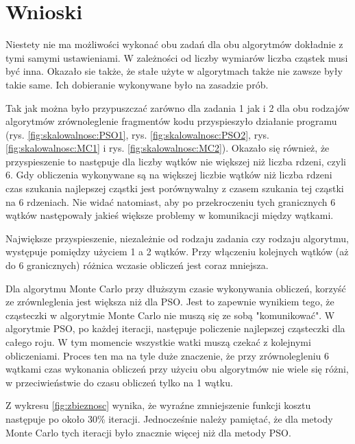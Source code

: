 \documentclass[11pt, a4paper, oneside]{article}
\begin{document}
\section{Wnioski} 

Niestety nie ma możliwości wykonać obu zadań dla obu algorytmów dokładnie z tymi samymi ustawieniami. W zależności od liczby wymiarów liczba cząstek musi być inna. Okazało sie także, że stałe użyte w algorytmach także nie zawsze były takie same. Ich dobieranie wykonywane było na zasadzie prób.

Tak jak można było przypuszczać zarówno dla zadania 1 jak i 2 dla obu rodzajów algorytmów zrównoleglenie fragmentów kodu przyspieszyło działanie programu (rys. \ref{fig:skalowalnosc:PSO1}, rys. \ref{fig:skalowalnosc:PSO2}, rys. \ref{fig:skalowalnosc:MC1} i rys. \ref{fig:skalowalnosc:MC2}). Okazało się również, że przyspieszenie to następuje dla liczby wątków nie większej niż liczba rdzeni, czyli 6. Gdy obliczenia wykonywane są na większej liczbie wątków niż liczba rdzeni czas szukania najlepszej cząstki jest porównywalny z czasem szukania tej cząstki na 6 rdzeniach. Nie widać natomiast, aby po przekroczeniu tych granicznych 6 wątków następowały jakieś większe problemy w komunikacji między wątkami.

Największe przyspieszenie, niezależnie od rodzaju zadania czy rodzaju algorytmu, występuje pomiędzy użyciem 1 a 2 wątków. Przy włączeniu kolejnych wątków (aż do 6 granicznych) różnica wczasie obliczeń jest coraz mniejsza.

Dla algorytmu Monte Carlo przy dłuższym czasie wykonywania obliczeń, korzyść ze zrównleglenia jest większa niż dla PSO. Jest to zapewnie wynikiem tego, że cząsteczki w algorytmie Monte Carlo nie muszą się ze sobą "komunikować". W algorytmie PSO, po każdej iteracji, następuje policzenie najlepszej cząsteczki dla całego roju. W tym momencie wszystkie watki muszą czekać z kolejnymi obliczeniami. Proces ten ma na tyle duże znaczenie, że przy zrównolegleniu 6 wątkami czas wykonania obliczeń przy użyciu obu algorytmów nie wiele się różni, w przeciwieństwie do czasu obliczeń tylko na 1 wątku.

Z wykresu \ref{fig:zbieznosc} wynika, że wyraźne zmniejszenie funkcji kosztu następuje po około 30\% iteracji. Jednocześnie należy pamiętać, że dla metody Monte Carlo tych iteracji było znacznie więcej niż dla metody PSO.


{}

\end{document}

